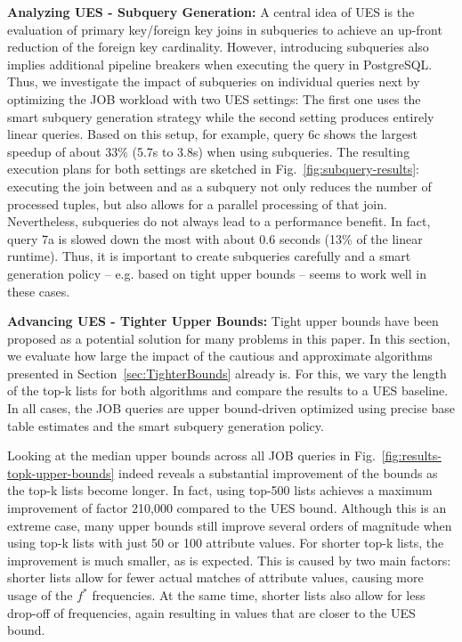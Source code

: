 \textbf{Analyzing UES - Subquery Generation:}
A central idea of UES is the evaluation of primary key/foreign key joins in subqueries to achieve an up-front reduction of the foreign key cardinality.
However, introducing subqueries also implies additional pipeline breakers when executing the query in PostgreSQL.
Thus, we investigate the impact of subqueries on individual queries next by optimizing the JOB workload with two UES settings: The first one uses the smart subquery generation strategy while the second setting produces entirely linear queries.
Based on this setup, for example, query 6c shows the largest speedup of about 33\% (5.7s to 3.8s) when using subqueries.
The resulting execution plans for both settings are sketched in Fig.~\ref{fig:subquery-results}: executing the join between  and  as a subquery not only reduces the number of processed tuples, but also allows for a parallel processing of that join.
Nevertheless, subqueries do not always lead to a performance benefit.
In fact, query 7a is slowed down the most with about 0.6 seconds (13\% of the linear runtime).
Thus, it is important to create subqueries carefully and a smart generation policy -- e.g. based on tight upper bounds -- seems to work well in these cases.



\textbf{Advancing UES - Tighter Upper Bounds:}
Tight upper bounds have been proposed as a potential solution for many problems in this paper.
In this section, we evaluate how large the impact of the cautious and approximate algorithms presented in Section~\ref{sec:TighterBounds} already is.
For this, we vary the length of the top-k lists for both algorithms and compare the results to a UES baseline.
In all cases, the JOB queries are upper bound-driven optimized using precise base table estimates and the smart subquery generation policy.

Looking at the median upper bounds across all JOB queries in Fig.~\ref{fig:results-topk-upper-bounds} indeed reveals a substantial improvement of the bounds as the top-k lists become longer.
In fact, using top-500 lists achieves a maximum improvement of factor 210,000 compared to the UES bound.
Although this is an extreme case, many upper bounds still improve several orders of magnitude when using top-k lists with just 50 or 100 attribute values.
For shorter top-k lists, the improvement is much smaller, as is expected.
This is caused by two main factors: shorter lists allow for fewer actual matches of attribute values, causing more usage of the $f^\ast$ frequencies.
At the same time, shorter lists also allow for less drop-off of frequencies, again resulting in values that are closer to the UES bound.

